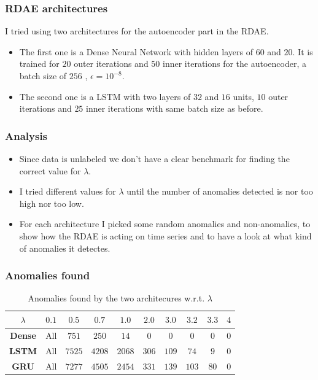 \documentclass{beamer}
\theoremstyle{plain}
\theoremstyle{definition}
\theoremstyle{remark}
\begin{document}
\begin{frame}
	\frametitle{RDAE architectures}
	I tried using two architectures for the autoencoder part in the RDAE.
	\begin{itemize}
		\item The first one is a Dense Neural Network with hidden layers of $60$ and $20$. It is trained for $20$ outer iterations and $50$ inner iterations for the autoencoder, a batch size of $256$ , $\epsilon=10^{-8}$.
		\item The second one is a LSTM with two layers of $32$ and $16$ units, $10$ outer iterations and $25$ inner iterations with same batch size as before. 
	\end{itemize}
\end{frame}

\begin{frame}
	\frametitle{Analysis}
	\begin{itemize}
		\item Since data is unlabeled we don't have a clear benchmark for finding the correct value for $\lambda$.
		\item I tried different values for $\lambda$ until the number of anomalies detected is nor too high nor too low.
		\item For each architecture I picked some random anomalies and non-anomalies, to show how the RDAE is acting on time series and to have a look at what kind of anomalies it detectes.
	\end{itemize}
\end{frame}

\begin{frame}
	\frametitle{Anomalies found}
	\begin{table}[width=\linewidth]
		\begin{tabular}{|c|c|c|c|c|c|c|c|c|c|}
		\hline
		\textbf{$\lambda$} & \textbf{$0.1$} & \textbf{$0.5$} & \textbf{$0.7$} & \textbf{$1.0$}  & \textbf{$2.0$} & \textbf{$3.0$} & \textbf{$3.2$} & \textbf{$3.3$} & \textbf{$4$}\\ \hline
		\textbf{Dense} & All       & $751$          & $250$          & $14$     & $0$            & $0$            & $0$            & $0$            & $0$ \\ \hline
		\textbf{LSTM}  & All        & $7525$         & $4208$         & $2068$  & $306$          & $109$          & $74$           & $9$            & $0$ \\ \hline
		\textbf{GRU}  & All        & $7277$         & $4505$         & $2454$  & $331$          & $139$          & $103$           & $80$            & $0$ \\ \hline
		\end{tabular}
		\caption[]{Anomalies found by the two architecures w.r.t. $\lambda$}
	\end{table}
\end{frame}
\end{document}
